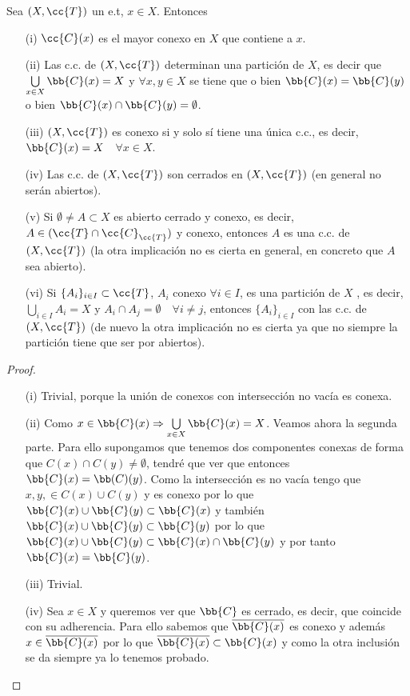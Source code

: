 \begin{prop}
    Sea $(X, \cc{T})$ un e.t, $x\in X$. Entonces
    \begin{enumerate}
        \item[(i)] $\cc{C}(x)$ es el mayor conexo en $X$ que contiene a $x$.
        \item[(ii)] Las c.c. de $(X, \cc{T})$ determinan una partición de $X$, es decir que $\bigcup\limits_{x\in X}\bb{C}(x)=X$ y $\forall x,y\in X$ se tiene que o bien $\bb{C}(x)=\bb{C}(y)$ o bien $\bb{C}(x)\cap \bb{C}(y)=\emptyset$.
        \item[(iii)] $(X, \cc{T})$ es conexo si y solo sí tiene una única c.c., es decir, $\bb{C}(x)=X$\ \ $\forall x \in X$.
        \item[(iv)] Las c.c. de $(X, \cc{T})$ son cerrados en $(X, \cc{T})$ (en general no serán abiertos).
        \item[(v)] Si $\emptyset \neq A \subset X$ es abierto cerrado y conexo, es decir, $A\in (\cc{T}\cap \cc{C}_{\cc{T}})$ y conexo, entonces $A$ es una c.c. de $(X, \cc{T})$ (la otra implicación no es cierta en general, en concreto que $A$ sea abierto). 
        \item[(vi)] Si $\{A_i\}_{i\in I}\subset \cc{T}$, $A_i$ conexo $\forall i \in I$, es una partición de $X$ , es decir, $\bigcup\limits_{i\in I}A_i=X$ y $A_i\cap A_j=\emptyset$\ \ $\forall i \neq j$, entonces $\{A_i\}_{i\in I}$ con las c.c. de $(X, \cc{T})$ (de nuevo la otra implicación no es cierta ya que no siempre la partición tiene que ser por abiertos).
    \end{enumerate}
    \begin{proof}\
        \begin{enumerate}
            \item[(i)] Trivial, porque la unión de conexos con intersección no vacía es conexa.
            \item[(ii)] Como $x\in \bb{C}(x) \Rightarrow \bigcup\limits_{x\in X}\bb{C}(x)=X$. Veamos ahora la segunda parte. Para ello supongamos que tenemos dos componentes conexas de forma que $C(x)\cap C(y)\neq \emptyset $, tendré que ver que entonces $\bb{C}(x)=\bb(C)(y)$. Como la intersección es no vacía tengo que $x,y,\in C(x)\cup C(y)$ y es conexo por lo que $\bb{C}(x)\cup \bb{C}(y)\subset \bb{C}(x)$ y también $\bb{C}(x)\cup \bb{C}(y)\subset \bb{C}(y)$ por lo que $\bb{C}(x)\cup \bb{C}(y)\subset \bb{C}(x)\cap \bb{C}(y)$ y por tanto $\bb{C}(x)=\bb{C}(y)$.
            \item[(iii)] Trivial.
            \item[(iv)] Sea $x\in X$ y queremos ver que $\bb{C}$ es cerrado, es decir, que coincide con su adherencia. Para ello sabemos que $\overline{\bb{C}(x)}$ es conexo y además $x\in \overline{\bb{C}(x)}$ por lo que $\overline{\bb{C}(x)}\subset \bb{C}(x)$ y como la otra inclusión se da siempre ya lo tenemos probado.

\end{enumerate}
\end{proof}
\end{prop}
